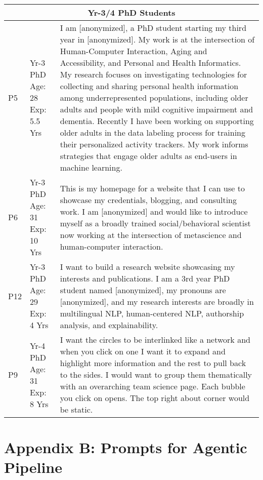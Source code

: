 \begin{longtable}{|p{1cm}|p{2cm}|p{10cm}|}
\multicolumn{3}{|c|}{\textbf{Yr-3/4 PhD Students}} \\ \hline
P5 & Yr-3 PhD \newline Age: 28 \newline Exp: 5.5 Yrs & I am [anonymized], a PhD student starting my third year in [anonymized]. My work is at the intersection of Human-Computer Interaction, Aging and Accessibility, and Personal and Health Informatics. My research focuses on investigating technologies for collecting and sharing personal health information among underrepresented populations, including older adults and people with mild cognitive impairment and dementia. Recently I have been working on supporting older adults in the data labeling process for training their personalized activity trackers. My work informs strategies that engage older adults as end-users in machine learning. \\ \hline
P6 & Yr-3 PhD \newline Age: 31 \newline Exp: 10 Yrs & This is my homepage for a website that I can use to showcase my credentials, blogging, and consulting work. I am [anonymized] and would like to introduce myself as a broadly trained social/behavioral scientist now working at the intersection of metascience and human-computer interaction. \\ \hline
P12 & Yr-3 PhD \newline Age: 29 \newline Exp: 4 Yrs & I want to build a research website showcasing my interests and publications. I am a 3rd year PhD student named [anonymized], my pronouns are [anonymized], and my research interests are broadly in multilingual NLP, human-centered NLP, authorship analysis, and explainability. \\ \hline
P9 & Yr-4 PhD \newline Age: 31 \newline Exp: 8 Yrs & I want the circles to be interlinked like a network and when you click on one I want it to expand and highlight more information and the rest to pull back to the sides. I would want to group them thematically with an overarching team science page. Each bubble you click on opens. The top right about corner would be static. \\ \hline
\end{longtable}

\newpage

\section{Appendix B: Prompts for Agentic Pipeline}
\label{appendix:b}

